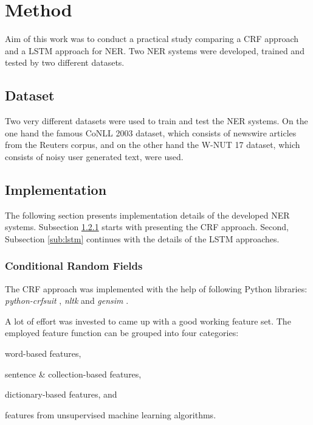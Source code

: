 \documentclass[12pt]{book}
\begin{document}
	\chapter{Method}
	\label{chap:method}
	
	Aim of this work was to conduct a practical study comparing a CRF approach and a LSTM approach for NER. Two NER systems were developed, trained and tested by two different datasets. 
	
	\section{Dataset}
	
	Two very different datasets were used to train and test the NER systems. On the one hand the famous CoNLL 2003 \cite{sang2003introduction} dataset, which consists of newswire articles from the Reuters corpus, and on the other hand the W-NUT 17 \cite{derczynski2017results} dataset, which consists of noisy user generated text, were used.
	
	\section{Implementation}
	
	The following section presents implementation details of the developed NER systems. Subsection \ref{sub:CRF} starts with presenting the CRF approach. Second, Subsection \ref{sub:lstm} continues with the details of the LSTM approaches.
	
	\subsection{Conditional Random Fields}
	\label{sub:CRF}
	
	The CRF approach was implemented with the help of following Python libraries: \textit{python-crfsuit} \cite{pycrfsuite}, \textit{nltk} \cite{nltk} and \textit{gensim} \cite{gensim}.
	
	A lot of effort was invested to came up with a good working feature set. The employed feature function can be grouped into four categories: \begin{enumerate*}
		\item word-based features,
		\item sentence \& collection-based features,
		\item dictionary-based features, and
		\item features from unsupervised machine learning algorithms.
	\end{enumerate*}
\end{document}

